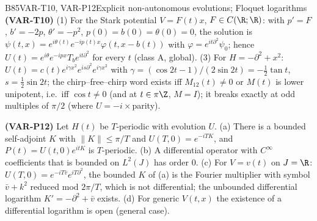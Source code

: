 \begin{dimcard}{B85}{VAR-T10, VAR-P12}{Explicit non-autonomous evolutions; Floquet logarithms}{\pw}{}
\textbf{(VAR-T10)} (1) For the Stark potential $V=F(t)x$, $F\in C(\R;\R)$: with $p'=F$, $b'=-2p$, $\theta'=-p^2$, $p(0)=b(0)=\theta(0)=0$, the solution is $\psi(t,x)=e^{i\theta(t)}e^{-ip(t)x}\varphi(t,x-b(t))$ with $\varphi=e^{it\partial^2}\psi_0$; hence $U(t)=e^{i\theta}e^{-ipx}T_be^{it\partial^2}$ for every $t$ (class A, global). (3) For $H=-\partial^2+x^2$: $U(t)=c(t)e^{i\gamma x^2}e^{is\partial^2}e^{i\gamma x^2}$ with $\gamma=(\cos2t-1)/(2\sin2t)=-\tfrac12\tan t$, $s=\tfrac12\sin2t$; the chirp--free--chirp word exists iff $M_{12}(t)\ne0$ or $M(t)$ is lower unipotent, i.e.\ iff $\cos t\ne0$ (and at $t\in\pi\Z$, $M=I$); it breaks exactly at odd multiples of $\pi/2$ (where $U=-i\times$parity).

\textbf{(VAR-P12)} Let $H(t)$ be $T$-periodic with evolution $U$. (a) There is a bounded self-adjoint $K$ with $\|K\|\le\pi/T$ and $U(T,0)=e^{-iTK}$, and $P(t)=U(t,0)e^{itK}$ is $T$-periodic. (b) A differential operator with $C^\infty$ coefficients that is bounded on $L^2(J)$ has order $0$. (c) For $V=v(t)$ on $J=\R$: $U(T,0)=e^{-iT\bar v}e^{iT\partial^2}$, the bounded $K$ of (a) is the Fourier multiplier with symbol $\bar v+k^2$ reduced mod $2\pi/T$, which is not differential; the unbounded differential logarithm $K'=-\partial^2+\bar v$ exists. (d) For generic $V(t,x)$ the existence of a differential logarithm is open (general case).
\end{dimcard}

